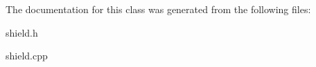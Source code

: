 The documentation for this class was generated from the following files\-:\begin{DoxyCompactItemize}
\item 
shield.\-h\item 
shield.\-cpp\end{DoxyCompactItemize}
